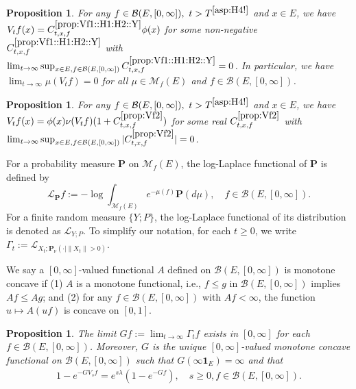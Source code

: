 \documentclass[12pt,a4paper]{amsart}
\numberwithin{equation}{section}
\theoremstyle{plain}
\newtheorem{prop}[thm]{Proposition}
\theoremstyle{definition}
\theoremstyle{remark}
\begin{document}
\begin{prop} \label{prop:Vf1::H1:H2::Y}
	For any $f\in \mathcal B(E, [0,\infty]),~t > T^{\eqref{asp:H4!}}$ and $x\in E$, we have $V_tf(x) = C^{\ref{prop:Vf1::H1:H2::Y}}_{t,x,f} \phi(x)$ for some non-negative $C_{t,x,f}^{\ref{prop:Vf1::H1:H2::Y}}$ with $\lim_{t\to \infty} \sup_{x\in E, f\in \mathcal B(E, [0,\infty])}  C^{\ref{prop:Vf1::H1:H2::Y}}_{t,x,f} = 0$.
	In particular, we have $\lim_{t\to \infty} \mu(V_tf)= 0 $ for all $\mu \in \mathcal M_f(E)$ and $f\in \mathcal B(E,[0,\infty])$.
\end{prop}

\begin{prop} \label{prop:Vf2}
	For any $f\in \mathcal B(E,[0,\infty]),~t>T^{\eqref{asp:H4!}}$ and $x\in E$, we have $V_tf(x) = \phi(x) \nu (V_tf) (1+C^{\ref{prop:Vf2}}_{t,x,f}) $ for some real $C^{\ref{prop:Vf2}}_{t,x,f}$ with
$\lim_{t\to \infty} \sup_{x\in E, f\in \mathcal B(E, [0,\infty])} |C^{\ref{prop:Vf2}}_{t,x,f}| = 0$.
\end{prop}

	For a probability measure $\mathbf P$ on $\mathcal M_f(E)$,
    the log-Laplace functional of $\mathbf P$ is defined by
	\[
	\mathscr L_\mathbf P f := - \log \int_{\mathcal M_f(E)}  e^{-\mu(f)} \mathbf P(d\mu), \quad
	f\in \mathcal B(E,[0,\infty]).
	\]
	For a finite random measure $\{Y; P\}$, the log-Laplace functional of its distribution is denoted as $\mathscr L_{Y;P}$.
	To simplify our notation, for each $t\geq 0$, we write $\Gamma_t := \mathscr L_{X_t;\mathbf P_\nu(\cdot | \|X_t\|>0)}$.

	We say a $[0,\infty]$-valued functional $A$ defined on $\mathcal B(E,[0,\infty])$ is monotone concave if
	(1) $A$ is a monotone functional, i.e., $f\leq g$ in $\mathcal B(E,[0,\infty])$ implies $Af \leq Ag$; and
	(2) for any $f\in \mathcal B(E,[0,\infty])$ with $Af< \infty$, the function $u \mapsto A(uf)$ is concave on $[0,1]$.

\begin{prop} \label{prop:G}
	The limit $Gf:= \lim_{t\to \infty} \Gamma_t f$ exists in $[0,\infty]$ for each $f\in \mathcal B(E,[0,\infty])$.
	Moreover, $G$ is the unique $[0,\infty]$-valued monotone concave functional on $\mathcal B(E,[0,\infty])$ such that
	$G(\infty  \mathbf 1_E) = \infty$ and that
\begin{align} \label{eq:G.0}
	1 - e^{- GV_s f}
	= e^{s\lambda} (1 - e^{-Gf}),
	\quad s\geq 0, f\in \mathcal B(E,[0,\infty]).
\end{align}
\end{prop}
\end{document}
